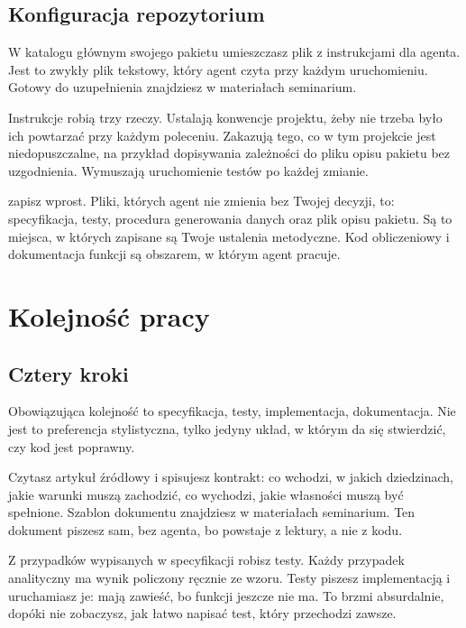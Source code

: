 \subsection{Konfiguracja repozytorium}

W katalogu głównym swojego pakietu umieszczasz plik z instrukcjami dla agenta. Jest to zwykły plik tekstowy, który agent czyta przy każdym uruchomieniu. Gotowy do uzupełnienia znajdziesz w materiałach seminarium.

Instrukcje robią trzy rzeczy. Ustalają konwencje projektu, żeby nie trzeba było ich powtarzać przy każdym poleceniu. Zakazują tego, co w tym projekcie jest niedopuszczalne, na przykład dopisywania zależności do pliku opisu pakietu bez uzgodnienia. Wymuszają uruchomienie testów po każdej zmianie.

 zapisz wprost. Pliki, których agent nie zmienia bez Twojej decyzji, to: specyfikacja, testy, procedura generowania danych oraz plik opisu pakietu. Są to miejsca, w których zapisane są Twoje ustalenia metodyczne. Kod obliczeniowy i dokumentacja funkcji są obszarem, w którym agent pracuje.

\section{Kolejność pracy}

\subsection{Cztery kroki}

Obowiązująca kolejność to specyfikacja, testy, implementacja, dokumentacja. Nie jest to preferencja stylistyczna, tylko jedyny układ, w którym da się stwierdzić, czy kod jest poprawny.

 Czytasz artykuł źródłowy i spisujesz kontrakt: co wchodzi, w jakich dziedzinach, jakie warunki muszą zachodzić, co wychodzi, jakie własności muszą być spełnione. Szablon dokumentu znajdziesz w materiałach seminarium. Ten dokument piszesz sam, bez agenta, bo powstaje z lektury, a nie z kodu.

 Z przypadków wypisanych w specyfikacji robisz testy. Każdy przypadek analityczny ma wynik policzony ręcznie ze wzoru. Testy piszesz  implementacją i uruchamiasz je: mają zawieść, bo funkcji jeszcze nie ma. To brzmi absurdalnie, dopóki nie zobaczysz, jak łatwo napisać test, który przechodzi zawsze.

